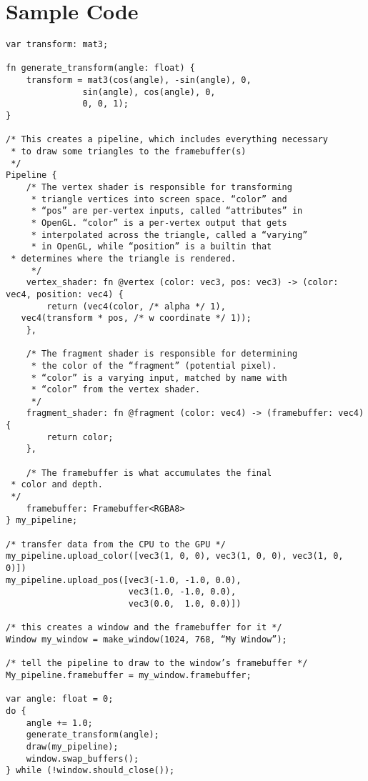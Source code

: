 \documentclass[11pt]{article}
\begin{document}
   
    

\section{Sample Code}

\begin{lstlisting}
var transform: mat3;

fn generate_transform(angle: float) {
    transform = mat3(cos(angle), -sin(angle), 0,
               sin(angle), cos(angle), 0,
               0, 0, 1);
}

/* This creates a pipeline, which includes everything necessary
 * to draw some triangles to the framebuffer(s)
 */
Pipeline {
    /* The vertex shader is responsible for transforming
     * triangle vertices into screen space. “color” and
     * “pos” are per-vertex inputs, called “attributes” in
     * OpenGL. “color” is a per-vertex output that gets
     * interpolated across the triangle, called a “varying”
     * in OpenGL, while “position” is a builtin that 
 * determines where the triangle is rendered.
     */
    vertex_shader: fn @vertex (color: vec3, pos: vec3) -> (color: vec4, position: vec4) {
        return (vec4(color, /* alpha */ 1),
   vec4(transform * pos, /* w coordinate */ 1));
    },

    /* The fragment shader is responsible for determining
     * the color of the “fragment” (potential pixel).
     * “color” is a varying input, matched by name with
     * “color” from the vertex shader.
     */
    fragment_shader: fn @fragment (color: vec4) -> (framebuffer: vec4) {
        return color;
    },
    
    /* The framebuffer is what accumulates the final
 * color and depth.
 */
    framebuffer: Framebuffer<RGBA8>
} my_pipeline;

/* transfer data from the CPU to the GPU */
my_pipeline.upload_color([vec3(1, 0, 0), vec3(1, 0, 0), vec3(1, 0, 0)])
my_pipeline.upload_pos([vec3(-1.0, -1.0, 0.0),
                        vec3(1.0, -1.0, 0.0),
                        vec3(0.0,  1.0, 0.0)])

/* this creates a window and the framebuffer for it */
Window my_window = make_window(1024, 768, “My Window”);

/* tell the pipeline to draw to the window’s framebuffer */
My_pipeline.framebuffer = my_window.framebuffer;

var angle: float = 0;
do {
    angle += 1.0;
    generate_transform(angle);
    draw(my_pipeline);
    window.swap_buffers();
} while (!window.should_close());

\end{lstlisting}
\end{document}
